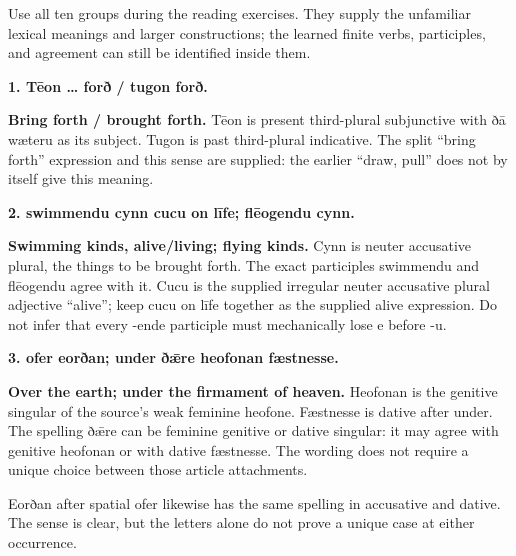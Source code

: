Use all ten groups during the reading exercises. They supply the unfamiliar lexical meanings and larger constructions; the learned finite verbs, participles, and agreement can still be identified inside them.

\textbf{1. Tēon … forð /\allowbreak{} tugon forð.}

\textbf{Bring forth /\allowbreak{} brought forth.} Tēon is present third-plural subjunctive with ðā wæteru as its subject. Tugon is past third-plural indicative. The split “bring forth” expression and this sense are supplied: the earlier “draw, pull” does not by itself give this meaning.

\textbf{2. swimmendu cynn cucu on līfe; flēogendu cynn.}

\textbf{Swimming kinds, alive/\allowbreak{}living; flying kinds.} Cynn is neuter accusative plural, the things to be brought forth. The exact participles swimmendu and flēogendu agree with it. Cucu is the supplied irregular neuter accusative plural adjective “alive”; keep cucu on līfe together as the supplied alive expression. Do not infer that every -ende participle must mechanically lose e before -u.

\textbf{3. ofer eorðan; under ðǣre heofonan fæstnesse.}

\textbf{Over the earth; under the firmament of heaven.} Heofonan is the genitive singular of the source’s weak feminine heofone. Fæstnesse is dative after under. The spelling ðǣre can be feminine genitive or dative singular: it may agree with genitive heofonan or with dative fæstnesse. The wording does not require a unique choice between those article attachments.

Eorðan after spatial ofer likewise has the same spelling in accusative and dative. The sense is clear, but the letters alone do not prove a unique case at either occurrence.


